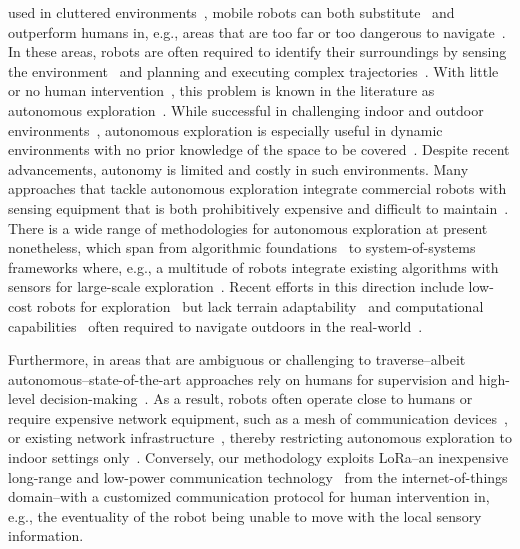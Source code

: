 \documentclass[lettersize,journal]{IEEEtran}
\begin{document}
 used in cluttered environments~\cite{kohlbrecher2014hector,kulkarni2022autonomous,tranzatto2022cerberus,kim2022autonomous}, mobile robots can both substitute~\cite{rubio2019review} and outperform humans in, e.g., areas that are too far or too dangerous to navigate~\cite{takahiro2022legged,roucek2020darpa,tabib2022autonomous,ebadi2020lamp}. In these areas, robots are often required to identify their surroundings by sensing the environment~\cite{mei2006energy} and planning and executing complex trajectories~\cite{shrestha2019learned,eldemiry2022autonomous}. With little or no human intervention~\cite{alatise2020review}, this problem is known in the literature as autonomous exploration~\cite{shrestha2019learned}. 
While successful in challenging indoor and outdoor environments~\cite{lluvia2021active,placed2022survey}, 
autonomous exploration is especially useful in dynamic environments with no prior knowledge of the space to be covered~\cite{bircher2016receding,rubio2019review}.
Despite recent advancements, autonomy is limited and costly in such environments. 
Many approaches that tackle autonomous exploration 
integrate commercial robots with sensing equipment that is both prohibitively expensive and difficult to maintain~\cite{lluvia2021active,placed2022survey,muller2021openbot,tabib2022autonomous,tardioli2019ground,ebadi2020lamp,dang2019graph,surmann2003autonomous}. 
There is a wide range of methodologies for autonomous exploration at present~\cite{placed2022survey} nonetheless, which span from algorithmic foundations~\cite{yamauchi1997frontier,placed2022survey,dang2019graph} to system-of-systems frameworks where, e.g., a multitude of robots integrate existing algorithms with sensors for large-scale exploration~\cite{tranzatto2022cerberus,roucek2020darpa,tardioli2019ground,tabib2022autonomous,ebadi2020lamp}. 
Recent efforts in this direction include low-cost robots for exploration~\cite{muller2021openbot, zhou2021smartphone,faisal2021low} but lack terrain adaptability~\cite{muller2021openbot} and computational capabilities~\cite{zhou2021smartphone,faisal2021low} often required to navigate outdoors in the real-world~\cite{rubio2019review,kulkarni2022autonomous}.

Furthermore, in areas that are ambiguous or challenging to traverse--albeit autonomous--state-of-the-art approaches rely on humans for supervision and high-level decision-making~\cite{tranzatto2022cerberus,roucek2020darpa,tabib2022autonomous}. 
As a result, robots often operate close to humans or require expensive network equipment, such as a mesh of communication devices~\cite{tranzatto2022cerberus,kulkarni2022autonomous,ebadi2020lamp}, or existing network infrastructure~\cite{khairuldanial2019mobile,baek2022ros,voigtlander20175g}, thereby restricting autonomous exploration to indoor settings only~\cite{delgado2022oros,cadena2016past,eldemiry2022autonomous,corah2019communication,papachristos2017uncertainty}.
Conversely, our methodology exploits LoRa--an inexpensive long-range and low-power communication technology~\cite{shanmuga2020survey} from the internet-of-things domain--with a customized communication protocol 
for human intervention in, e.g., the eventuality of the robot being unable to move with the local sensory information. 
\end{document}
